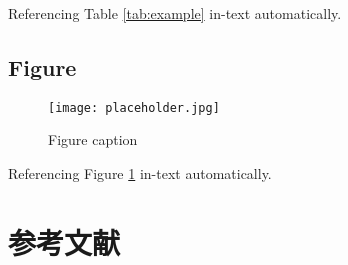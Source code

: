 \documentclass[11pt,twoside]{book} %
\begin{document}
Referencing Table \ref{tab:example} in-text automatically.


\section{Figure}

\begin{figure}[h]
    \centering\texttt{[image: placeholder.jpg]}
    \caption{Figure caption}
    \label{fig:placeholder} %
\end{figure}

Referencing Figure \ref{fig:placeholder} in-text automatically.

\renewcommand{\bibname}{参考文献}
\chapter*{参考文献}
\printbibliography[heading=bibempty]





\renewcommand{\indexname}{索引}
\cleardoublepage %
\setlength{\columnsep}{0.75cm} %
\printindex %

\end{document}
